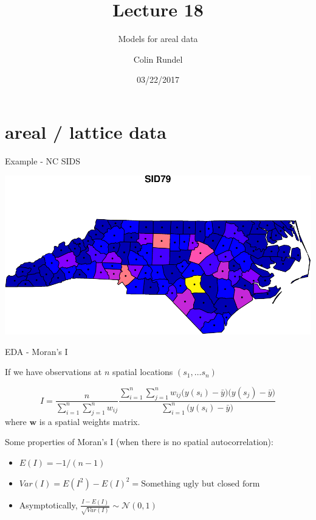 \documentclass[11pt,ignorenonframetext,]{beamer}
\title{Lecture 18}
\subtitle{Models for areal data}
\author{Colin Rundel}
\date{03/22/2017}
\providecommand{\tightlist}{%
  \setlength{\itemsep}{0pt}\setlength{\parskip}{0pt}}
\begin{document}
\frame{\titlepage}

\section{areal / lattice data}\label{areal-lattice-data}

\begin{frame}{Example - NC SIDS}

\includegraphics{Lec18_files/figure-beamer/unnamed-chunk-1-1.pdf}

\end{frame}

\begin{frame}[t]{EDA - Moran's I}

If we have observations at \(n\) spatial locations \((s_1, \ldots s_n)\)

\[ I = \frac{n}{\sum_{i=1}^n \sum_{j=1}^n w_{ij}} \frac{\sum_{i=1}^n \sum_{j=1}^n w_{ij} \big(y(s_i)-\bar{y}\big)\big(y(s_j)-\bar{y}\big)}{\sum_{i=1}^n \big(y(s_i) - \bar{y}\big)} \]
where \(\bm{w}\) is a spatial weights matrix.

\pause

\vspace{7mm}

Some properties of Moran's I (when there is no spatial autocorrelation):

\begin{itemize}
\tightlist
\item
  \(E(I) = -1 / (n-1)\)
\end{itemize}

\vspace{2mm}

\begin{itemize}
\tightlist
\item
  \(Var(I) = E(I^2) - E(I)^2 = \text{Something ugly but closed form}\)
\end{itemize}

\vspace{2mm}

\begin{itemize}
\tightlist
\item
  Asymptotically,
  \(\frac{I - E(I)}{\sqrt{Var(I)}} \sim \mathcal{N}(0,1)\)
\end{itemize}

\end{frame}
\end{document}
